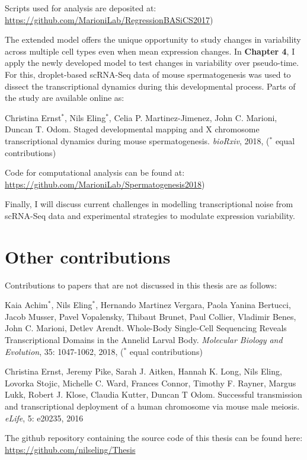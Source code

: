 Scripts used for analysis are deposited at:\\
\url{https://github.com/MarioniLab/RegressionBASiCS2017})

The extended model offers the unique opportunity to study changes in variability across multiple cell types even when mean expression changes. 
In \textbf{Chapter 4}, I apply the newly developed model to test changes in variability over pseudo-time. 
For this, droplet-based scRNA-Seq data of mouse spermatogenesis was used to dissect the transcriptional dynamics during this developmental process. 
Parts of the study are available online as:

\begin{Abstract}
\hspace{-5mm} Christina Ernst$^\ast$, Nils Eling$^\ast$, Celia P. Martinez-Jimenez, John C. Marioni, Duncan T. Odom. 
Staged developmental mapping and X chromosome transcriptional dynamics during mouse spermatogenesis. \emph{bioRxiv}, 2018, ($^\ast$ equal contributions)
\end{Abstract}

Code for computational analysis can be found at:\\
\url{https://github.com/MarioniLab/Spermatogenesis2018})

Finally, I will discuss current challenges in modelling transcriptional noise from scRNA-Seq data and experimental strategies to modulate expression variability.

\newpage

\section{Other contributions}

Contributions to papers that are not discussed in this thesis are as follows:\\

\begin{Abstract}
\hspace{-5mm} Kaia Achim$^\ast$, Nils Eling$^\ast$, Hernando Martinez Vergara, Paola Yanina Bertucci, Jacob Musser, Pavel Vopalensky, Thibaut Brunet, Paul Collier, Vladimir Benes, John C. Marioni, Detlev Arendt. 
Whole-Body Single-Cell Sequencing Reveals Transcriptional Domains in the Annelid Larval Body. \emph{Molecular Biology and Evolution}, 35: 1047-1062, 2018, ($^\ast$ equal contributions)
\end{Abstract}

\begin{Abstract}
\hspace{-5mm} Christina Ernst, Jeremy Pike, Sarah J. Aitken, Hannah K. Long, Nils Eling, Lovorka Stojic, Michelle C. Ward, Frances Connor, Timothy F. Rayner, Margus Lukk, Robert J. Klose, Claudia Kutter, Duncan T Odom. 
Successful transmission and transcriptional deployment of a human chromosome via mouse male meiosis. \emph{eLife}, 5: e20235, 2016 
\end{Abstract}

The github repository containing the source code of this thesis can be found here:
\url{https://github.com/nilseling/Thesis}